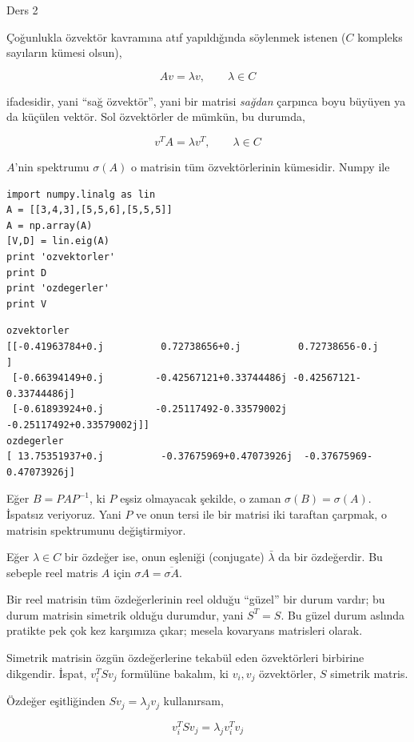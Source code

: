 \documentclass[12pt,fleqn]{article}\usepackage{../../common}
\begin{document}
Ders 2

Çoğunlukla özvektör kavramına atıf yapıldığında söylenmek istenen ($C$
kompleks sayıların kümesi olsun),

$$ Av = \lambda v, \qquad \lambda \in C $$

ifadesidir, yani ``sağ özvektör'', yani bir matrisi {\em sağdan} çarpınca
boyu büyüyen ya da küçülen vektör. Sol özvektörler de mümkün, bu durumda, 

$$ v^TA = \lambda v^T, \qquad \lambda \in C $$

$A$'nin spektrumu $\sigma(A)$ o matrisin tüm özvektörlerinin
kümesidir. Numpy ile

\begin{verbatim}
import numpy.linalg as lin
A = [[3,4,3],[5,5,6],[5,5,5]]
A = np.array(A)
[V,D] = lin.eig(A)
print 'ozvektorler'
print D
print 'ozdegerler'
print V
\end{verbatim}

\begin{verbatim}
ozvektorler
[[-0.41963784+0.j          0.72738656+0.j          0.72738656-0.j        ]
 [-0.66394149+0.j         -0.42567121+0.33744486j -0.42567121-0.33744486j]
 [-0.61893924+0.j         -0.25117492-0.33579002j -0.25117492+0.33579002j]]
ozdegerler
[ 13.75351937+0.j          -0.37675969+0.47073926j  -0.37675969-0.47073926j]
\end{verbatim}

Eğer $B = PAP^{-1}$, ki $P$ eşsiz olmayacak şekilde, o zaman $\sigma(B) =
\sigma(A)$. İspatsız veriyoruz. Yani $P$ ve onun tersi ile bir matrisi iki
taraftan çarpmak, o matrisin spektrumunu değiştirmiyor.

Eğer $\lambda \in C$ bir özdeğer ise, onun eşleniği (conjugate)
$\bar{\lambda}$ da bir özdeğerdir. Bu sebeple reel matris $A$ için
$\sigma{A} = \overline{\sigma{A}}$. 

Bir reel matrisin tüm özdeğerlerinin reel olduğu ``güzel'' bir durum
vardır; bu durum matrisin simetrik olduğu durumdur, yani $S^T = S$. Bu
güzel durum aslında pratikte pek çok kez karşımıza çıkar; mesela kovaryans
matrisleri olarak.

Simetrik matrisin özgün özdeğerlerine tekabül eden özvektörleri birbirine
dikgendir. İspat, $v_i^T S v_j $ formülüne bakalım, ki $v_i,v_j$
özvektörler, $S$ simetrik matris.

Özdeğer eşitliğinden $S v_j = \lambda_j v_j$ kullanırsam,

$$ v_i^T S v_j  = \lambda_j v_i^T v_j $$
\end{document}
